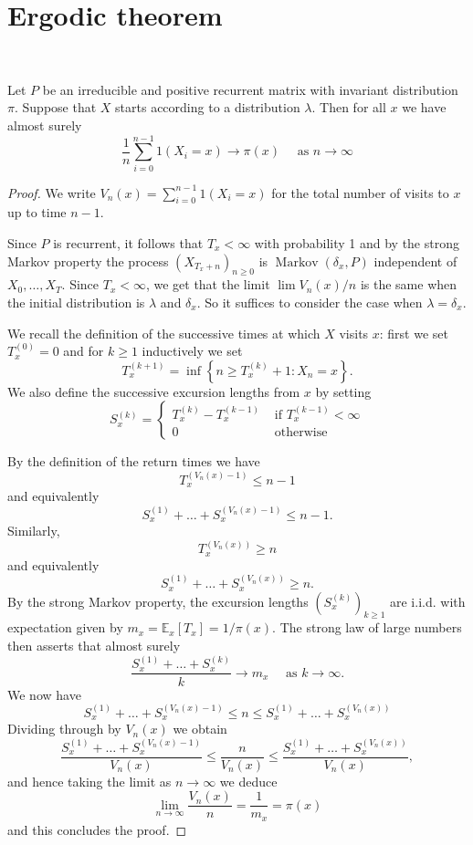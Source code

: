 \documentclass[a4paper]{article}
\begin{document}
\section{Ergodic theorem}\ \vspace{-1.5em}
\begin{theorem}\label{thm:Ergodic theorem}
    Let $P$ be an irreducible and positive recurrent matrix with invariant distribution $\pi$. Suppose that $X$ starts according to a distribution $\lambda$. Then for all $x$ we have almost surely
\[
\frac{1}{n} \sum_{i=0}^{n-1} 1\left(X_i=x\right) \rightarrow \pi(x) \quad \text { as } n \rightarrow \infty
\]
\end{theorem}
\begin{proof}
    We write $V_n(x)=\sum_{i=0}^{n-1} 1\left(X_i=x\right)$ for the total number of visits to $x$ up to time $n-1$.

Since $P$ is recurrent, it follows that $T_x<\infty$ with probability 1 and by the strong Markov property the process $\left(X_{T_x+n}\right)_{n \geq 0}$ is $\operatorname{Markov}\left(\delta_x, P\right)$ independent of $X_0, \ldots, X_T$. Since $T_x<\infty$, we get that the limit $\lim V_n(x) / n$ is the same when the initial distribution is $\lambda$ and $\delta_x$. So it suffices to consider the case when $\lambda=\delta_x$.

We recall the definition of the successive times at which $X$ visits $x$: first we set $T_x^{(0)}=0$ and for $k \geq 1$ inductively we set
\[
T_x^{(k+1)}=\inf \left\{n \geq T_x^{(k)}+1: X_n=x\right\} .
\]
We also define the successive excursion lengths from $x$ by setting
\[
S_x^{(k)}= \begin{cases}T_x^{(k)}-T_x^{(k-1)} & \text { if } T_x^{(k-1)}<\infty \\ 0 & \text { otherwise }\end{cases}
\]

By the definition of the return times we have
\[
T_x^{\left(V_n(x)-1\right)} \leq n-1
\]
and equivalently
\[
S_x^{(1)}+\ldots+S_x^{\left(V_n(x)-1\right)} \leq n-1 .
\]
Similarly,
\[
T_x^{\left(V_n(x)\right)} \geq n
\]
and equivalently
\[
S_x^{(1)}+\ldots+S_x^{\left(V_n(x)\right)} \geq n .
\]
By the strong Markov property, the excursion lengths $\left(S_x^{(k)}\right)_{k \geq 1}$ are i.i.d. with expectation given by $m_x=\mathbb{E}_x\left[T_x\right]=1 / \pi(x)$. The strong law of large numbers then asserts that almost surely
\[
\frac{S_x^{(1)}+\ldots+S_x^{(k)}}{k} \rightarrow m_x \quad \text { as } k \rightarrow \infty .
\]
We now have
\[
S_x^{(1)}+\ldots+S_x^{\left(V_n(x)-1\right)} \leq n \leq S_x^{(1)}+\ldots+S_x^{\left(V_n(x)\right)}
\]
Dividing through by $V_n(x)$ we obtain
\[
\frac{S_x^{(1)}+\ldots+S_x^{\left(V_n(x)-1\right)}}{V_n(x)} \leq \frac{n}{V_n(x)} \leq \frac{S_x^{(1)}+\ldots+S_x^{\left(V_n(x)\right)}}{V_n(x)},
\]
and hence taking the limit as $n \rightarrow \infty$ we deduce
\[
\lim _{n \rightarrow \infty} \frac{V_n(x)}{n}=\frac{1}{m_x}=\pi(x)
\]
and this concludes the proof.
\end{proof}
\end{document}
